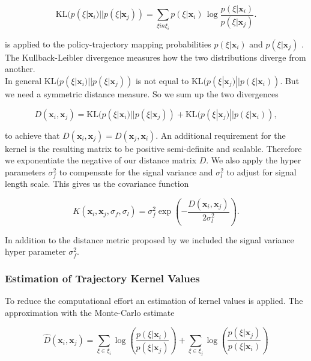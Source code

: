 $$\mathrm {KL}(p(\xi|\mathbf{x}_{ i })||p(\xi|\mathbf{x}_{ j })) = \sum _{\xi in \xi_i}p(\xi|\mathbf{x}_{ i })\,\log {\frac {p(\xi|\mathbf{x}_{ i })}{p(\xi|\mathbf{x}_{ j })}}.$$

is applied to the policy-trajectory mapping probabilities $p(\xi|\mathbf{x}_{ i })$ and $p(\xi|\mathbf{x}_{ j })$ \cite{wilson2014using}. The Kullback-Leibler divergence measures how the two distributions diverge from another.\\

In general $\mathrm {KL}(p(\xi|\mathbf{x}_{ i })||p(\xi|\mathbf{x}_{ j }))$ is not equal to $\mathrm {KL}(p(\xi|\mathbf{x}_{ j })||p(\xi|\mathbf{x}_{ i }))$. But we need a symmetric distance measure. So we sum up the two divergences

$$D(\mathbf{x}_{ i }, \mathbf{x}_{ j }) = \mathrm {KL}(p(\xi|\mathbf{x}_{ i })||p(\xi|\mathbf{x}_{ j })) + \mathrm {KL}(p(\xi|\mathbf{x}_{ j })||p(\xi|\mathbf{x}_{ i })),$$

to achieve that $D(\mathbf{x}_{ i }, \mathbf{x}_{ j }) = D(\mathbf{x}_{ j }, \mathbf{x}_{ i })$. An additional requirement for the kernel is the resulting matrix to be positive semi-definite and scalable\cite{wilson2014using}. Therefore we exponentiate the negative of our distance matrix $D$. We also apply the hyper parameters $\sigma_f^2$ to compensate for the signal variance and $\sigma_l^2$ to adjust for signal length scale. This gives us the covariance function

\begin{equation} \label{eq:trajKernel}
K(\mathbf{x}_{ i },\mathbf{x}_{ j },\sigma_f,\sigma_l) = \sigma_f^2 \exp\left(-\frac{D(\mathbf{x}_i,\mathbf{x}_j)}{2\sigma_l^2} \right).
\end{equation}

In addition to the distance metric proposed by \cite{wilson2014using} we included the signal variance hyper parameter $\sigma_f^2$.

\subsubsection{Estimation of Trajectory Kernel Values}
To reduce the computational effort an estimation of kernel values is applied. The approximation with the Monte-Carlo estimate

\begin{equation} \label{eq:tk:mc}
    \hat{D}(\mathbf{x}_{ i }, \mathbf{x}_{ j }) = \sum _{\xi \in \xi_i} \log\left( \frac{p(\xi|\mathbf{x}_{ i })}{p(\xi|\mathbf{x}_{ j })} \right) + \sum _{\xi \in \xi_j} \log\left( \frac{p(\xi|\mathbf{x}_{ j })}{p(\xi|\mathbf{x}_{ i })} \right)
\end{equation}

